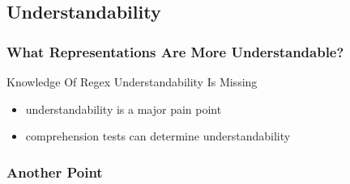 \subsection{Understandability}

{
\begin{frame}
\frametitle{What Representations Are More Understandable?}
\begin{block}{\begin{large}Knowledge Of Regex Understandability Is Missing\end{large}}
\begin{itemize}
\item \begin{large}understandability is a major pain point\end{large}
\item \begin{large}comprehension tests can determine understandability\end{large}
\end{itemize}
\end{block}
\end{frame}
}




\begin{frame}
\frametitle{Another Point}
\end{frame}


